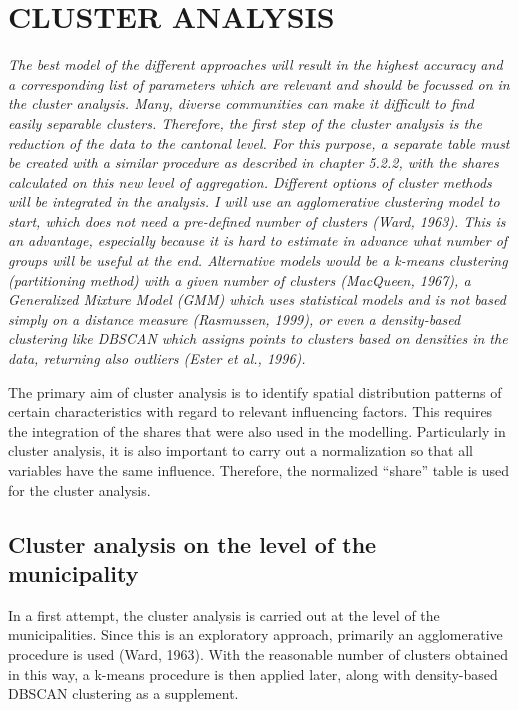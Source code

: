 \documentclass[
]{article}
\begin{document}
\newpage

\hypertarget{cluster-analysis}{%
\section{CLUSTER ANALYSIS}\label{cluster-analysis}}

\emph{The best model of the different approaches will result in the
highest accuracy and a corresponding list of parameters which are
relevant and should be focussed on in the cluster analysis. Many,
diverse communities can make it difficult to find easily separable
clusters. Therefore, the first step of the cluster analysis is the
reduction of the data to the cantonal level. For this purpose, a
separate table must be created with a similar procedure as described in
chapter 5.2.2, with the shares calculated on this new level of
aggregation. Different options of cluster methods will be integrated in
the analysis. I will use an agglomerative clustering model to start,
which does not need a pre-defined number of clusters (Ward, 1963). This
is an advantage, especially because it is hard to estimate in advance
what number of groups will be useful at the end. Alternative models
would be a k-means clustering (partitioning method) with a given number
of clusters (MacQueen, 1967), a Generalized Mixture Model (GMM) which
uses statistical models and is not based simply on a distance measure
(Rasmussen, 1999), or even a density-based clustering like DBSCAN which
assigns points to clusters based on densities in the data, returning
also outliers (Ester et al., 1996).}

The primary aim of cluster analysis is to identify spatial distribution
patterns of certain characteristics with regard to relevant influencing
factors. This requires the integration of the shares that were also used
in the modelling. Particularly in cluster analysis, it is also important
to carry out a normalization so that all variables have the same
influence. Therefore, the normalized ``share'' table is used for the
cluster analysis.

\hypertarget{cluster-analysis-on-the-level-of-the-municipality}{%
\subsection{Cluster analysis on the level of the
municipality}\label{cluster-analysis-on-the-level-of-the-municipality}}

In a first attempt, the cluster analysis is carried out at the level of
the municipalities. Since this is an exploratory approach, primarily an
agglomerative procedure is used (Ward, 1963). With the reasonable number
of clusters obtained in this way, a k-means procedure is then applied
later, along with density-based DBSCAN clustering as a supplement.
\end{document}
